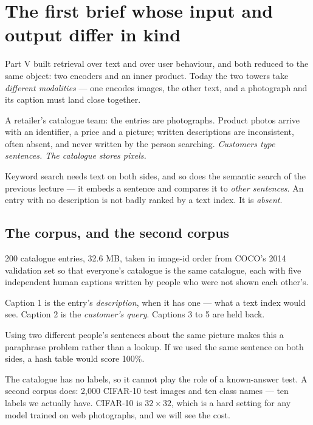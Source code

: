 \documentclass[11pt,a4paper]{article}
\begin{document}

\section{The first brief whose input and output differ in kind}

Part V built retrieval over text and over user behaviour, and both reduced to
the same object: two encoders and an inner product. Today the two towers take
\emph{different modalities} --- one encodes images, the other text, and a
photograph and its caption must land close together.

A retailer's catalogue team: the entries are photographs. Product photos arrive
with an identifier, a price and a picture; written descriptions are
inconsistent, often absent, and never written by the person searching.
\emph{Customers type sentences. The catalogue stores pixels.}

Keyword search needs text on both sides, and so does the semantic search of the
previous lecture --- it embeds a sentence and compares it to \emph{other
sentences}. An entry with no description is not badly ranked by a text index.
It is \emph{absent}.

\subsection{The corpus, and the second corpus}

200 catalogue entries, 32.6 MB, taken in image-id order from COCO's 2014
validation set so that everyone's catalogue is the same catalogue, each with
five independent human captions written by people who were not shown each
other's.

\begin{keybox}[title={Two different uses for five captions}]
Caption 1 is the entry's \emph{description}, when it has one --- what a text
index would see. Caption 2 is the \emph{customer's query}. Captions 3 to 5 are
held back.

Using two different people's sentences about the same picture makes this a
paraphrase problem rather than a lookup. If we used the same sentence on both
sides, a hash table would score 100\%.
\end{keybox}

The catalogue has no labels, so it cannot play the role of a known-answer test.
A second corpus does: 2{,}000 CIFAR-10 test images and ten class names --- ten
labels we actually have. CIFAR-10 is $32\times32$, which is a hard setting for
any model trained on web photographs, and we will see the cost.
\end{document}
